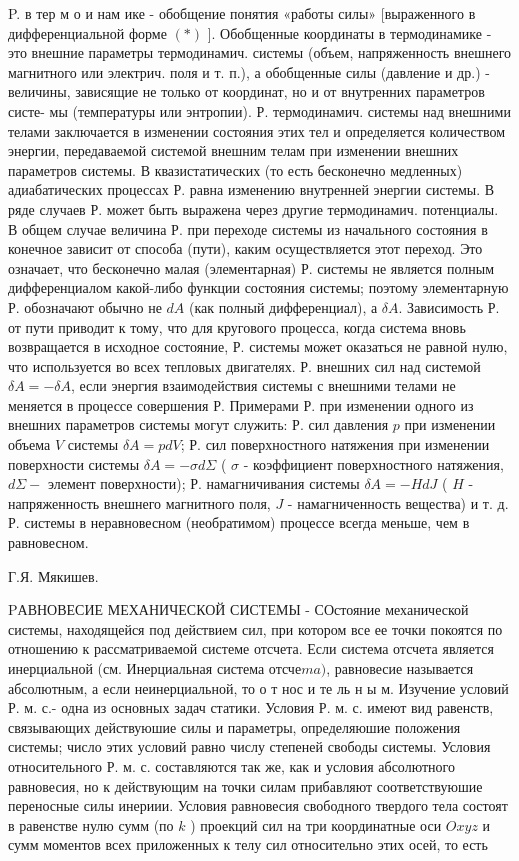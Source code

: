 \documentclass[10pt]{article}
\begin{document}
P. в тер м о и нам ике - обобщение понятия «работы силы» [выраженного в дифференциальной форме $(*)$ ]. Обобщенные координаты в термодинамике - это внешние параметры термодинамич. системы (объем, напряженность внешнего магнитного или электрич. поля и т. п.), а обобщенные силы (давление и др.) - величины, зависящие не только от координат, но и от внутренних параметров систе- мы (температуры или энтропии). Р. термодинамич. системы над внешними телами заключается в изменении состояния этих тел и определяется количеством энергии, передаваемой системой внешним телам при изменении внешних параметров системы. В квазистатических (то есть бесконечно медленных) адиабатических процессах Р. равна изменению внутренней энергии системы. В ряде случаев Р. может быть выражена через другие термодинамич. потенциалы. В общем случае величина Р. при переходе системы из начального состояния в конечное зависит от способа (пути), каким осуществляется этот переход. Это означает, что бесконечно малая (элементарная) Р. системы не является полным дифференциалом какой-либо функции состояния системы; поэтому элементарную Р. обозначают обычно не $d A$ (как полный дифференциал), а $\delta A$. Зависимость Р. от пути приводит к тому, что для кругового процесса, когда система вновь возвращается в исходное состояние, Р. системы может оказаться не равной нулю, что используется во всех тепловых двигателях. Р. внешних сил над системой $\delta A=-\delta A$, если энергия взаимодействия системы с внешними телами не меняется в процессе совершения Р. Примерами Р. при изменении одного из внешних параметров системы могут служить: Р. сил давления $p$ при изменении объема $V$ системы $\delta A=p d V$; Р. сил поверхностного натяжения при изменении поверхности системы $\delta A=-\sigma d \Sigma$ ( $\sigma$ - коэффициент поверхностного натяжения, $d \Sigma-$ элемент поверхности); Р. намагничивания системы $\delta A=-H d J$ ( $H$ - напряженность внешнего магнитного поля, $J$ - намагниченность вещества) и т. д. Р. системы в неравновесном (необратимом) процессе всегда меньше, чем в равновесном.



Г.Я. Мякишев.



PАВНОВЕСИЕ МЕХАНИЧЕСКОЙ СИСТЕМЫ - СОстояние механической системы, находящейся под действием сил, при котором все ее точки покоятся по отношению к рассматриваемой системе отсчета. Если система отсчета является инерциальной (см. Инерциальная система отсче$m a)$, равновесие называется абсолютным, а если неинерциальной, то о т нос и те ль н ы м. Изучение условий Р. м. с.- одна из основных задач статики. Условия Р. м. с. имеют вид равенств, связывающих действуюшие силы и параметры, определяюшие положения системы; число этих условий равно числу степеней свободы системы. Условия относительного Р. м. с. составляются так же, как и условия абсолютного равновесия, но к действующим на точки силам прибавляют соответствуюшие переносные силы инериии. Условия равновесия свободного твердого тела состоят в равенстве нулю сумм (по $k$ ) проекций сил на три координатные оси $O x y z$ и сумм моментов всех приложенных к телу сил относительно этих осей, то есть
\end{document}
